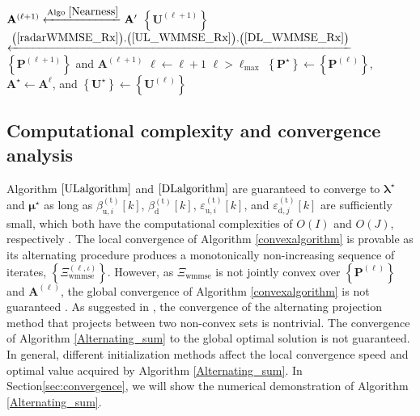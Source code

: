 \documentclass[9pt,journal]{IEEEtran}
\newcommand{\paren}[1]{\left({#1}\right)}
\newcommand{\bracket}[1]{{\left [{#1}\right ]}}
\newcommand{\braces}[1]{{\left\{ {#1}\right\}}}
\begin{document}
\begin{algorithm}[ht!]
\begin{algorithmic}[1]
			\State $\mathbf{A}^{\paren{\mathrm{\ell+1}}}\xleftarrow{\textrm{Algo }\ref{Nearness}}\mathbf{A}^\prime$  %
			\State $\braces{\mathbf{U}^{\paren{\mathrm{\ell+1}}}}$ $\xleftarrow{\mathrm{\paren{\ref{radarWMMSE_Rx}}},\mathrm{\paren{\ref{UL_WMMSE_Rx}}},\mathrm{\paren{\ref{DL_WMMSE_Rx}}}}$  $\braces{\mathbf{P}^{\paren{\mathrm{\ell+1}}}}$ and $\mathbf{A}^{\paren{\mathrm{\ell+1}}}$ 
			\State $\mathrm{\ell}\leftarrow\mathrm{\ell}+1$
			\Until $\mathrm{\ell}>\mathrm{\ell}_{\textrm{max}}$
			\State $\braces{\mathbf{P}^\star}\leftarrow\braces{\mathbf{P}^{\paren{\mathrm{\ell}}}}$, $\mathbf{A}^\star\leftarrow\mathbf{A}^{\mathrm{\ell}}$, and $\braces{\mathbf{U}^\star}\leftarrow\braces{\mathbf{U}^{\paren{\mathrm{\ell}}}}$
			\State \Return{$\braces{\mathbf{P}^\star},\braces{\mathbf{U}^\star},\mathbf{A}^\star$}
		\end{algorithmic}
	\end{algorithm}\normalsize
\subsection{Computational complexity and convergence analysis}
Algorithm $\ref{ULalgorithm}$ and $\ref{DLalgorithm}$ are guaranteed to converge to $\boldsymbol{\lambda}^\star$ and $\boldsymbol{\mu}^\star$ as long as $\beta^{\paren{\mathrm{t}}}_{\textrm{u},i}\bracket{k}$, $\beta^{\paren{\mathrm{t}}}_{\textrm{d}}\bracket{k}$, $\varepsilon^{\paren{\mathrm{t}}}_{\textrm{u},i}\bracket{k}$, and $\varepsilon^{\paren{\mathrm{t}}}_{\textrm{d},j}\bracket{k}$ are sufficiently small, which both have the computational complexities of $O\paren{\mathit{I}}$ and $O\paren{\mathit{J}}$, respectively \cite{Lui2006subg}. The local convergence of Algorithm \ref{convexalgorithm} is provable as its alternating procedure produces a monotonically non-increasing sequence of iterates, $\braces{\Xi^{\paren{\ell,\iota}}_{\textrm{wmmse}}}$. However, as $\Xi_{\textrm{wmmse}}$ is not jointly convex over $\braces{\mathbf{P}^{\paren{\ell}}}$ and $\mathbf{A}^{\paren{\ell}}$, the global convergence of Algorithm \ref{convexalgorithm} is not guaranteed \cite{WMMSEWSR}.  As suggested in \cite{arXiv180203889Z}, the convergence of the alternating projection method that projects between two non-convex sets is nontrivial. The convergence of Algorithm \ref{Alternating_sum} to the global optimal solution is not guaranteed. In general, different initialization methods affect the local convergence speed and optimal value acquired by Algorithm \ref{Alternating_sum}. In Section\ref{sec:convergence}, we will show the numerical demonstration of Algorithm \ref{Alternating_sum}.
\end{document}

